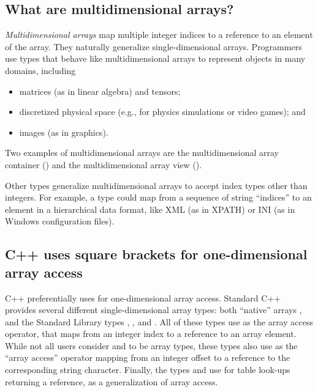 \documentclass{wg21}
\begin{document}
\subsection{What are multidimensional arrays?}

\emph{Multidimensional arrays} map multiple integer indices to a reference to an element of the array.
They naturally generalize single-dimensional arrays.
Programmers use types that behave like multidimensional arrays to represent objects in many domains, including

\begin{itemize}
\item matrices (as in linear algebra) and tensors;
\item discretized physical space (e.g., for physics simulations or video games); and
\item images (as in graphics).
\end{itemize}

Two examples of multidimensional arrays are the multidimensional array container  ()
and the multidimensional array view  ().

Other types generalize multidimensional arrays to accept index types other than integers.
For example, a type could map from a sequence of string ``indices'' to an element in a hierarchical data format,
like XML (as in XPATH) or INI (as in Windows configuration files).

\subsection{C++ uses square brackets for one-dimensional array access}

C++ preferentially uses  for one-dimensional array access.  Standard C++ provides several different single-dimensional array types: both ``native'' arrays , and the Standard Library types , , and .  All of these types use  as the array access operator, that maps from an integer index to a reference to an array element.  While not all users consider  and  to be array types, these types also use  as the ``array access'' operator mapping from an integer offset to a reference to the corresponding string character.  Finally, the types  and  use  for table look-ups returning a reference, as a generalization of array access.
\end{document}
